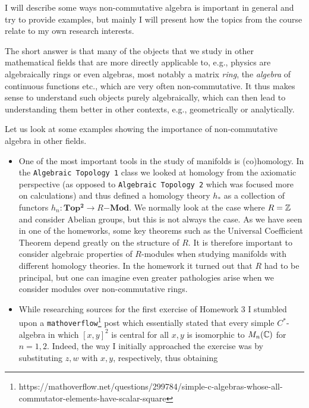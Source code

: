\documentclass[a4paper, 12pt]{article}
\begin{document}
\begin{Exercise}
    I will describe some ways non-commutative algebra is important in general and try to provide examples,
    but mainly I will present how the topics from the course relate to my own research interests.

    The short answer is that many of the objects that we study in other mathematical fields that are more directly applicable to, e.g., physics are algebraically rings or even algebras,
    most notably a matrix \emph{ring}, the \emph{algebra} of continuous functions etc., which are very often non-commutative.
    It thus makes sense to understand such objects purely algebraically, which can then lead to understanding them better in other contexts, e.g., geometrically or analytically.
    
    Let us look at some examples showing the importance of non-commutative algebra in other fields.
    \begin{itemize}
        \item
            One of the most important tools in the study of manifolds is (co)homology.
            In the \texttt{Algebraic Topology 1} class we looked at homology from the axiomatic perspective (as opposed to \texttt{Algebraic Topology 2} which was focused more on calculations)
            and thus defined a homology theory $h_*$ as a collection of functors $h_n\colon \mathbf{Top^2} \to R\mathbf{-Mod}$.
            We normally look at the case where $R = \mathbb{Z}$ and consider Abelian groups, but this is not always the case.
            As we have seen in one of the homeworks, some key theorems such as the Universal Coefficient Theorem depend greatly on the structure of $R$.
            It is therefore important to consider algebraic properties of $R$-modules when studying manifolds with different homology theories.
            In the homework it turned out that $R$ had to be principal, but one can imagine even greater pathologies arise when we consider modules over non-commutative rings.
        \item
            While researching sources for the first exercise of Homework 3 I stumbled upon a \texttt{mathoverflow}\footnote{https://mathoverflow.net/questions/299784/simple-c-algebras-whose-all-commutator-elements-have-scalar-square}
            post which essentially stated that every simple $C^*$-algebra in which $[x, y]^2$ is central for all $x, y$ is isomorphic to $M_n(\mathbb{C})$ for $n = 1, 2$.
            Indeed, the way I initially approached the exercise was by substituting $z, w$ with $x, y$, respectively, thus obtaining

\end{itemize}
\end{Exercise}
\end{document}
